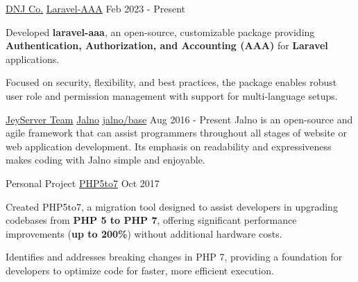 
\begin{cventries}
	\cventry
		{\href{https://dnj.co.ir}{DNJ Co.}} %
		{\href{https://github.com/dnj/laravel-aaa}{\faGithubSquare\acvHeaderIconSep Laravel-AAA}} %
		{} %
		{Feb 2023 - Present} %
		{
			\begin{cvitems}
				\item {Developed \textbf{laravel-aaa}, an open-source, customizable package providing \textbf{Authentication, Authorization, and Accounting (AAA)} for \textbf{Laravel} applications.}
				\item {Focused on security, flexibility, and best practices, the package enables robust user role and permission management with support for multi-language setups.}
			\end{cvitems}
		}

	\cventry
		{\href{https://jeyserver.com}{JeyServer Team}} %
		{\href{https://jalno.ir/en/}{\acvHeaderIconSep Jalno}} %
		{\href{https://github.com/jalno/base}{\faGithubSquare\acvHeaderIconSep jalno/base}} %
		{Aug 2016 - Present} %
		{Jalno is an open-source and agile framework that can assist programmers throughout all stages of website or web application development. Its emphasis on readability and expressiveness makes coding with Jalno simple and enjoyable.}

	\cventry
		{Personal Project} %
		{\href{https://github.com/yeganemehr/php5to7}{\faGithubSquare\acvHeaderIconSep PHP5to7}} %
		{} %
		{Oct 2017} %
		{
			\begin{cvitems}
				\item {Created PHP5to7, a migration tool designed to assist developers in upgrading codebases from \textbf{PHP 5 to PHP 7}, offering significant performance improvements (\textbf{up to 200\%}) without additional hardware costs.}
				\item {Identifies and addresses breaking changes in PHP 7, providing a foundation for developers to optimize code for faster, more efficient execution.}
			\end{cvitems}
		}
\end{cventries}
